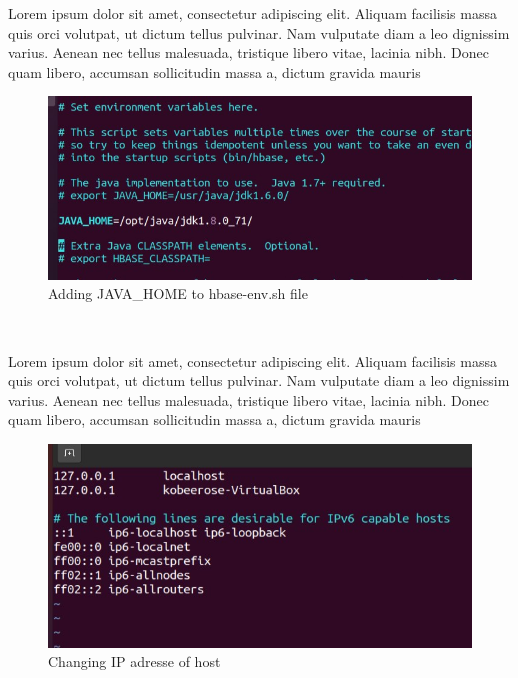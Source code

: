 \begin{spacing}{1.2}
\par Lorem ipsum dolor sit amet, consectetur adipiscing elit. Aliquam facilisis massa quis orci volutpat, ut dictum tellus pulvinar. Nam vulputate diam a leo dignissim varius. Aenean nec tellus malesuada, tristique libero vitae, lacinia nibh. Donec quam libero, accumsan sollicitudin massa a, dictum gravida mauris
\\
\begin{figure}[!htb] 
\begin{center} 
\includegraphics[width=1\linewidth]{Pictures/HBase/Configuring Hbase in Standalone & Pseudo-distributed mode/Installing and Configuring Apache Hbase/Adding JAVA_HOME to hbase-env.sh file} 
\end{center} 
\caption{Adding JAVA_HOME to hbase-env.sh file} 
\end{figure}  \FloatBarrier
\\

\par Lorem ipsum dolor sit amet, consectetur adipiscing elit. Aliquam facilisis massa quis orci volutpat, ut dictum tellus pulvinar. Nam vulputate diam a leo dignissim varius. Aenean nec tellus malesuada, tristique libero vitae, lacinia nibh. Donec quam libero, accumsan sollicitudin massa a, dictum gravida mauris
\\
\begin{figure}[!htb] 
\begin{center} 
\includegraphics[width=1\linewidth]{Pictures/HBase/Configuring Hbase in Standalone & Pseudo-distributed mode/Installing and Configuring Apache Hbase/Changing IP adresse of host} 
\end{center} 
\caption{Changing IP adresse of host} 
\end{figure}  \FloatBarrier
\\


\end{spacing}

